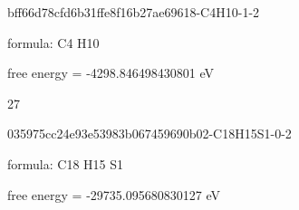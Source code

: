 \documentclass{article}
\begin{document}
\vspace{1cm}


bff66d78cfd6b31ffe8f16b27ae69618-C4H10-1-2



formula: C4 H10



free energy = -4298.846498430801 eV

27

\vspace{1cm}


035975cc24e93e53983b067459690b02-C18H15S1-0-2



formula: C18 H15 S1



free energy = -29735.095680830127 eV
\end{document}
